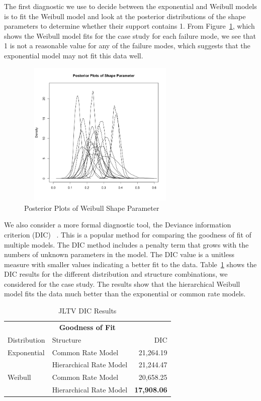 \documentclass[12pt]{article}
\begin{document}
The first diagnostic we use to decide between the exponential and Weibull models is
to fit the Weibull model and look at the posterior distributions of the shape
parameters to determine whether their support contains 1. From Figure~\ref{Shape}, which shows the Weibull model fits for the case study for each failure mode, we see that 1 is not a reasonable value for any of the failure modes, which suggests that the exponential model may not fit this data well.

\begin{figure}[h]
  \centering
      \includegraphics[width=8cm, height=7cm]{shapePostPlot}
  \caption{Posterior Plots of Weibull Shape Parameter}
  \label{Shape}
\end{figure}

We also consider a more formal diagnostic tool, the Deviance information criterion (DIC)
~\cite{ref4}. This is a popular method for comparing the goodness of fit of
multiple models. The DIC method includes a penalty term that grows with the
numbers of unknown parameters in the model.  The DIC value is a unitless measure with smaller values indicating a better fit to the data.  Table~\ref{table:ta1} shows the DIC results for the different distribution and structure
combinations, we considered for the case study. The results show that the hierarchical Weibull model fits the data
much better than the exponential or common rate models.

\begin{table}[h]
\centering
\begin{tabular}{|l|l|r|}
\multicolumn{3}{c}{\textbf{Goodness of Fit}} \\
\cline{1-3}
Distribution    & Structure & DIC \\
\hline
Exponential   & Common Rate Model                     & 21,264.19             \\
              & Hierarchical Rate Model               & 21,244.47             \\
Weibull       & Common Rate Model                     & 20,658.25             \\
              & Hierarchical Rate Model               & \textbf{17,908.06}    \\
\hline
\end{tabular}
\caption{JLTV DIC Results}
\label{table:ta1}
\end{table}
\end{document}
